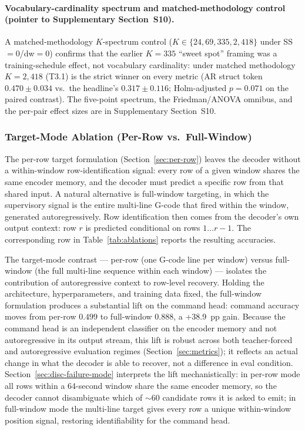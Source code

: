 \documentclass[sensors,article,submit,moreauthors,pdftex]{Definitions/mdpi}
\begin{document}


\paragraph{Vocabulary-cardinality spectrum and matched-methodology control (pointer to Supplementary Section~S10).}
A matched-methodology $K$-spectrum control ($K\!\in\!\{24, 69, 335, 2{,}418\}$ under SS$=$0/dw$=$0) confirms that the earlier $K\!=\!335$ ``sweet spot'' framing was a training-schedule effect, not vocabulary cardinality: under matched methodology $K\!=\!2{,}418$ (T3.1) is the strict winner on every metric (AR struct token $0.470 \pm 0.034$ vs.\ the headline's $0.317 \pm 0.116$; Holm-adjusted $p\!=\!0.071$ on the paired contrast). The five-point spectrum, the Friedman/ANOVA omnibus, and the per-pair effect sizes are in Supplementary Section~S10.

\subsubsection{Target-Mode Ablation (Per-Row vs.\ Full-Window)}
\label{sec:abl-target-mode}

The per-row target formulation (Section~\ref{sec:per-row}) leaves the decoder without a within-window row-identification signal: every row of a given window shares the same encoder memory, and the decoder must predict a specific row from that shared input. A natural alternative is full-window targeting, in which the supervisory signal is the entire multi-line G-code that fired within the window, generated autoregressively. Row identification then comes from the decoder's own output context: row $r$ is predicted conditional on rows $1\!\dots\!r-1$. The corresponding row in Table~\ref{tab:ablations} reports the resulting accuracies.

The target-mode contrast --- per-row (one G-code line per window) versus full-window (the full multi-line sequence within each window) --- isolates the contribution of autoregressive context to row-level recovery. Holding the architecture, hyperparameters, and training data fixed, the full-window formulation produces a substantial lift on the command head: command accuracy moves from per-row $0.499$ to full-window $0.888$, a +38.9~pp gain. Because the command head is an independent classifier on the encoder memory and not autoregressive in its output stream, this lift is robust across both teacher-forced and autoregressive evaluation regimes (Section~\ref{sec:metrics}); it reflects an actual change in what the decoder is able to recover, not a difference in eval condition. Section~\ref{sec:disc-failure-mode} interprets the lift mechanistically: in per-row mode all rows within a 64-second window share the same encoder memory, so the decoder cannot disambiguate which of $\sim$60 candidate rows it is asked to emit; in full-window mode the multi-line target gives every row a unique within-window position signal, restoring identifiability for the command head.
\end{document}
